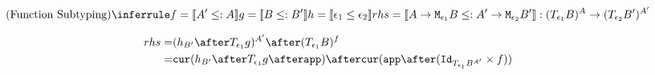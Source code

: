 {$$
\ntreeruleIII{Function Subtyping}{f = \deno{A' \subtype A} }{ g = \deno{B \subtype B'} }{ h=\dse{\e_1}{\e_2}}{rhs = \deno{\lamtype{A}{\e_1}{B} \subtype \lamtype{A'}{\e_2}{B'}}: (\T{\e_1}{B})^A \rightarrow (\T{\e_2}{B'})^{A'}}
$$

\begin{equation}
    \begin{split}
        rhs = & (h_{B'} \after \T{\e_1}{g})^{A'}
        \after (\T{\e_1}{B})^f \\
        = & \cur{h_{B'}  \after \T{\e_1}{g}\after \app} \after \cur{\app \after (\Id{\T{\e_1}{B}^{A'}} \times f)}\\
    \end{split}
\end{equation}
}

\ifdefined\NoDocument
\else
\documentclass{report}


    \CategoryRequirements{}

\fi
